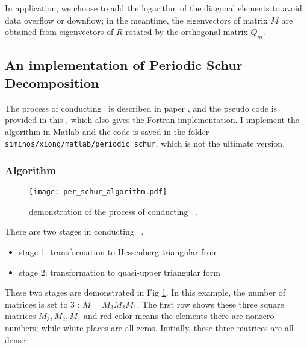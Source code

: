 		In application, we choose to add the logarithm of the diagonal elements to avoid data overflow or downflow; in the
		meantime, the eigenvectors of matrix $M$ are obtained from  eigenvectors of $R$ rotated by the orthogonal matrix
		$Q_{m}$.
		
\subsection{An implementation of Periodic Schur Decomposition }
\label{sect:PSDimpl1}
	The process of conducting \psd\ is described in paper , and the pseudo code is provided
	in this , which also gives the Fortran
	implementation. I implement the algorithm in Matlab and the code is saved in the folder
	\texttt{siminos/xiong/matlab/periodic\_schur}, which is not the ultimate version.
	
	\subsubsection{Algorithm}
		\begin{figure}[h]
			\centering
			\texttt{[image: per\_schur\_algorithm.pdf]}
			\caption{demonstration of the process of conducting \psd\ .}
			\label{fig:per_schur_algorithm}
		\end{figure}
		There are two stages in conducting \psd\ .
		\begin{itemize}
			\item stage 1: transformation to  Hessenberg-triangular from
			\item stage 2: transformation to  quasi-upper triangular form
		\end{itemize}
		These two stages are demonstrated in Fig \ref{fig:per_schur_algorithm}. In this example, the number of matrices
		is set to 3 : $M=M_{3}M_{2}M_{1}$. The first row shows these three square matrices $M_{3},M_{2},M_{1}$ and
		red color means the elements there are nonzero numbers; while white places are all zeros. Initially, these
		three matrices are all dense.
		
